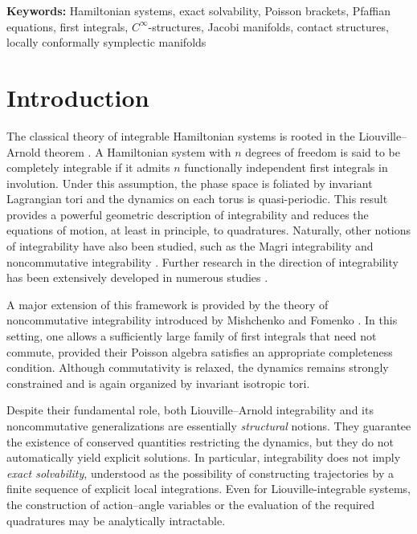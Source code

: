 \documentclass{article}
\theoremstyle{remark}
\theoremstyle{definition}
\newenvironment{keywords}{\setlength{\parindent}{0pt}}{}
\begin{document}
    
\begin{keywords}
\textbf{Keywords:} Hamiltonian systems, exact solvability, Poisson brackets,
Pfaffian equations, first integrals, \(C^\infty\)-structures, Jacobi manifolds, contact structures, locally conformally symplectic manifolds

\end{keywords}

\section{Introduction}

The classical theory of integrable Hamiltonian systems is rooted in the
Liouville--Arnold theorem \cite{Liouville,Arnold3}. A Hamiltonian system with $n$ degrees of freedom is
said to be completely integrable if it admits $n$ functionally independent first
integrals in involution. Under this assumption, the phase space is foliated by
invariant Lagrangian tori and the dynamics on each torus is quasi-periodic. This
result provides a powerful geometric description of integrability and reduces
the equations of motion, at least in principle, to quadratures. Naturally, other notions of integrability have also been studied, such as the Magri integrability \cite{Fuchssteiner,Magri,Olver} and noncommutative integrability \cite{Azuaje2,Carinena4,Grabowska,Kozlov,Mishchenko1978Generalized,Mishchenko1978Euler}. Further research in the direction of integrability has been extensively developed in numerous studies \cite{Carlet,Carlet2,Dubrovin,Lorenzoni2,Zhao2,Zhao3}.

A major extension of this framework is provided by the theory of noncommutative
integrability introduced by Mishchenko and Fomenko \cite{Mishchenko1978Generalized,Mishchenko1978Euler}. In this setting, one allows
a sufficiently large family of first integrals that need not commute, provided
their Poisson algebra satisfies an appropriate completeness condition. Although commutativity is
relaxed, the dynamics remains strongly constrained and is again organized by
invariant isotropic tori.

Despite their fundamental role, both Liouville--Arnold integrability and its
noncommutative generalizations are essentially \emph{structural} notions. They
guarantee the existence of conserved quantities restricting the dynamics, but
they do not automatically yield explicit solutions. In particular, integrability
does not imply \emph{exact solvability}, understood as the possibility of
constructing trajectories by a finite sequence of explicit local integrations. Even
for Liouville-integrable systems, the construction of action--angle variables \cite{Duistermaat1980,Nehorosev1972}
or the evaluation of the required quadratures may be analytically intractable.
\end{document}
